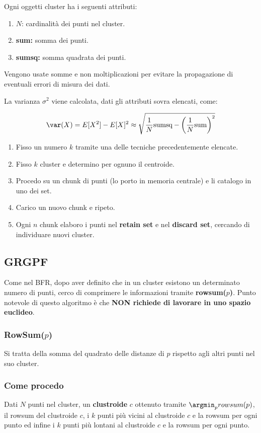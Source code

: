 \documentclass[\main/main.tex]{subfiles}
\begin{document}
Ogni oggetti cluster ha i seguenti attributi:

\begin{enumerate}
  \item $N$: cardinalità dei punti nel cluster.
  \item \textbf{sum:} somma dei punti.
  \item \textbf{sumsq:} somma quadrata dei punti.
\end{enumerate}

Vengono usate somme e non moltiplicazioni per evitare la propagazione di eventuali errori di misura dei dati.

La varianza $\sigma^2$ viene calcolata, dati gli attributi sovra elencati, come:

\[
  \var(X) = E[X^2] - E[X]^2 \approx \sqrt{\frac{1}{N} \text{sumsq} - \left(\frac{1}{N} \text{sum}\right)^2}
\]


\begin{enumerate}
  \item Fisso un numero $k$ tramite una delle tecniche precedentemente elencate.
  \item Fisso $k$ cluster e determino per ognuno il centroide.
  \item Procedo su un chunk di punti (lo porto in memoria centrale) e li catalogo in uno dei set.
  \item Carico un nuovo chunk e ripeto.
  \item Ogni $n$ chunk elaboro i punti nel \textbf{retain set} e nel \textbf{discard set}, cercando di individuare nuovi cluster.
\end{enumerate}

\subsection{GRGPF}
Come nel BFR, dopo aver definito che in un cluster esistono un determinato numero di punti, cerco di comprimere le informazioni tramite \textbf{rowsum($p$)}. Punto notevole di questo algoritmo è che \textbf{NON richiede di lavorare in uno spazio euclideo}.

\subsubsection{RowSum($p$)}
Si tratta della somma del quadrato delle distanze di $p$ rispetto agli altri punti nel suo cluster.

\subsubsection{Come procedo}
Dati $N$ punti nel cluster, un \textbf{clustroide} $c$ ottenuto tramite $\argmin_p rowsum(p)$, il rowsum del clustroide $c$, i $k$ punti più vicini al clustroide $c$ e la rowsum per ogni punto ed infine i $k$ punti più lontani al clustroide $c$ e la rowsum per ogni punto.
\end{document}
